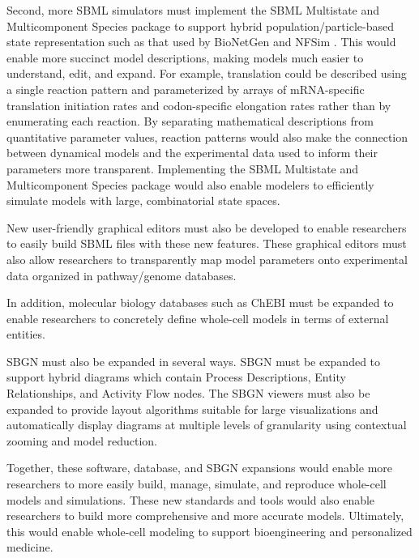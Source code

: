 \documentclass[journal,transmag]{IEEEtran}
\begin{document}
Second, more SBML simulators must implement the SBML Multistate and Multicomponent Species package to support hybrid population/particle-based state representation such as that used by BioNetGen \cite{Hlavacek2006, Hogg2014} and NFSim \cite{Sneddon2011}. This would enable more succinct model descriptions, making models much easier to understand, edit, and expand. For example, translation could be described using a single reaction pattern and parameterized by arrays of mRNA-specific translation initiation rates and codon-specific elongation rates rather than by enumerating each reaction. By separating mathematical descriptions from quantitative parameter values, reaction patterns would also make the connection between dynamical models and the experimental data used to inform their parameters more transparent. Implementing the SBML Multistate and Multicomponent Species package would also enable modelers to efficiently simulate models with large, combinatorial state spaces.

New user-friendly graphical editors must also be developed to enable researchers to easily build SBML files with these new features. These graphical editors must also allow researchers to transparently map model parameters onto experimental data organized in pathway/genome databases.

In addition, molecular biology databases such as ChEBI must be expanded to enable researchers to concretely define whole-cell models in terms of external entities. 

SBGN must also be expanded in several ways. SBGN must be expanded to support hybrid diagrams which contain Process Descriptions, Entity Relationships, and Activity Flow nodes. The SBGN viewers must also be expanded to provide layout algorithms suitable for large visualizations and automatically display diagrams at multiple levels of granularity using contextual zooming and model reduction. 

Together, these software, database, and SBGN expansions would enable more researchers to more easily build, manage, simulate, and reproduce whole-cell models and simulations. These new standards and tools would also enable researchers to build more comprehensive and more accurate models. Ultimately, this would enable whole-cell modeling to support bioengineering and personalized medicine.
\end{document}
